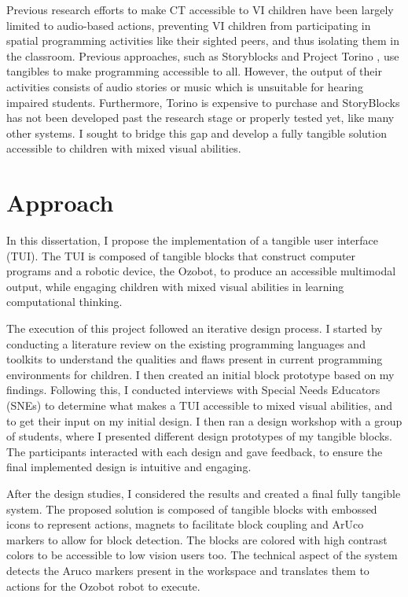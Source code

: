 \documentclass[oneside,%
                    author={Malak Hajji},
                    degree={BSc},
                    title={Designing An Accessible Ozobot Programming Platform for Students},
                  subtitle={With Mixed Visual Abilities}]{dissertation}
\begin{document}
Previous research efforts to make CT accessible to VI children have been largely limited to audio-based actions, preventing VI children from participating in spatial programming activities like their sighted peers, and thus isolating them in the classroom. Previous approaches, such as Storyblocks\cite{storyblocks} and Project Torino\cite{torino} , use tangibles to make programming accessible to all. However, the output of their activities consists of audio stories or music  which is unsuitable for hearing impaired students.
Furthermore, Torino is expensive to purchase and StoryBlocks has not been developed past the research stage or properly tested yet, like many other systems. 
I sought to bridge this gap and develop a fully tangible solution accessible to children with mixed visual abilities.
\section{Approach}
In this dissertation, I propose the implementation of a tangible user interface (TUI). The TUI is composed of tangible blocks that construct computer programs and a robotic device, the Ozobot, to produce an accessible multimodal output, while engaging children with mixed visual abilities in learning computational thinking. 

The execution of this project followed an iterative design process. I started by conducting a literature review on the existing programming languages and toolkits to understand the qualities and flaws present in current programming environments for children. I then created an initial block prototype based on my findings. Following this, I conducted interviews with Special Needs Educators (SNEs) to determine what makes a TUI accessible to mixed visual abilities, and to get their input on my initial design. I then ran a design workshop with a group of students, where I presented different design prototypes of my tangible blocks. The participants interacted with each design and gave feedback, to ensure the final implemented design is intuitive and engaging.

After the design studies, I considered the results and created a final fully tangible system. The proposed solution is composed of tangible blocks with embossed icons to represent actions, magnets to facilitate block coupling and ArUco markers to allow for block detection. The blocks are colored with high contrast colors to be accessible to low vision users too.
The technical aspect of the system detects the Aruco markers present in the  workspace and translates them to actions for the Ozobot robot to execute. 
\end{document}
